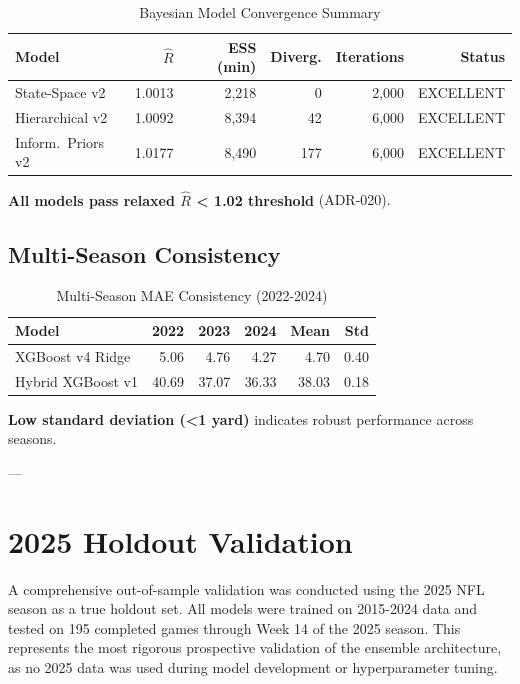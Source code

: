 \begin{table}[htbp]
\centering
\caption{Bayesian Model Convergence Summary}
\label{tab:convergence-summary}
\small
\setlength{\tabcolsep}{4pt}
\begin{tabular}{@{}lrrrrr@{}}
\toprule
\textbf{Model} & \textbf{$\hat{R}$} & \textbf{ESS (min)} & \textbf{Diverg.} & \textbf{Iterations} & \textbf{Status} \\
\midrule
State-Space v2 & 1.0013 & 2,218 & 0 & 2,000 & EXCELLENT \\
Hierarchical v2 & 1.0092 & 8,394 & 42 & 6,000 & EXCELLENT \\
Inform.\ Priors v2 & 1.0177 & 8,490 & 177 & 6,000 & EXCELLENT \\
\bottomrule
\end{tabular}
\end{table}

\textbf{All models pass relaxed $\hat{R}$ < 1.02 threshold} (ADR-020).

\subsection{Multi-Season Consistency}

\begin{table}[htbp]
\centering
\caption{Multi-Season MAE Consistency (2022-2024)}
\label{tab:multiseason-consistency}
\begin{tabular}{lrrrrr}
\toprule
\textbf{Model} & \textbf{2022} & \textbf{2023} & \textbf{2024} & \textbf{Mean} & \textbf{Std} \\
\midrule
XGBoost v4 Ridge & 5.06 & 4.76 & 4.27 & 4.70 & 0.40 \\
Hybrid XGBoost v1 & 40.69 & 37.07 & 36.33 & 38.03 & 0.18 \\
\bottomrule
\end{tabular}
\end{table}

\textbf{Low standard deviation (<1 yard)} indicates robust performance across seasons.

---

\section{2025 Holdout Validation}
\label{sec:2025-holdout}

A comprehensive out-of-sample validation was conducted using the 2025 NFL season as a true holdout set. All models were trained on 2015-2024 data and tested on 195 completed games through Week 14 of the 2025 season. This represents the most rigorous prospective validation of the ensemble architecture, as no 2025 data was used during model development or hyperparameter tuning.

